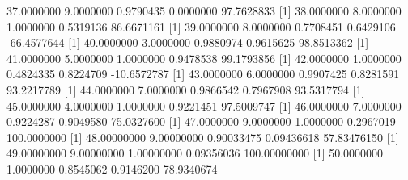 \documentclass{article}
\begin{document}
\begin{Schunk}
\begin{Soutput}
[1] 37.0000000  9.0000000  0.9790435  0.0000000 97.7628833
[1] 38.0000000  8.0000000  1.0000000  0.5319136 86.6671161
[1]  39.0000000   8.0000000   0.7708451   0.6429106 -66.4577644
[1] 40.0000000  3.0000000  0.9880974  0.9615625 98.8513362
[1] 41.0000000  5.0000000  1.0000000  0.9478538 99.1793856
[1]  42.0000000   1.0000000   0.4824335   0.8224709 -10.6572787
[1] 43.0000000  6.0000000  0.9907425  0.8281591 93.2217789
[1] 44.0000000  7.0000000  0.9866542  0.7967908 93.5317794
[1] 45.0000000  4.0000000  1.0000000  0.9221451 97.5009747
[1] 46.0000000  7.0000000  0.9224287  0.9049580 75.0327600
[1]  47.0000000   9.0000000   1.0000000   0.2967019 100.0000000
[1] 48.00000000  9.00000000  0.90033475  0.09436618 57.83476150
[1]  49.00000000   9.00000000   1.00000000   0.09356036 100.00000000
[1] 50.0000000  1.0000000  0.8545062  0.9146200 78.9340674
\end{Soutput}
\end{Schunk}
\end{document}
